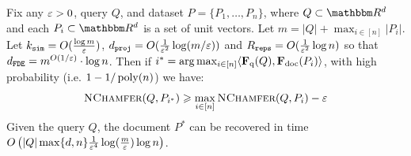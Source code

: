 \begin{theorem}\label{thm:FDE-ANN}
Fix any $\varepsilon > 0$, query $Q$, and dataset $P = \{P_1,\dots,P_n\}$, where $Q \subset \R^d$ and each $P_i \subset \R^d$ is a set of unit vectors. Let $m=|Q| + \max_{i \in [n]}|P_i|$. 
Let $k_{\texttt{sim}} = O(\frac{\log m}{\varepsilon})$, $d_{\texttt{proj}} = O(\frac{1}{\varepsilon^2} \log (m/\varepsilon))$ and $R_{\texttt{reps}} = O(\frac{1}{\varepsilon^2}\log n)$ so that $d_{\texttt{FDE}} =  m^{O(1/\varepsilon)} \cdot  \log n$. Then if $i^* = \arg \max_{i \in [n]}\langle \mathbf{F}_{\text{q}}(Q) , \mathbf{F}_{\text{doc}}(P_i) \rangle$, with high probability (i.e. $1-1/\operatorname{poly}(n)$) we have:
\[ \textsc{NChamfer}(Q,P_{i^*}) \geqslant \max_{i \in [n]} \textsc{NChamfer}(Q,P_i) - \varepsilon \]
Given the query $Q$, the document $P^*$ can be recovered in time $O\left(|Q| \max\{d,n\}  \frac{1}{\varepsilon^4} \log(\frac{m}{\varepsilon}) \log n \right)$. 
\end{theorem}











